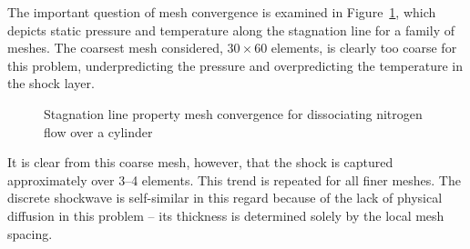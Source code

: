 The important question of mesh convergence is examined in Figure~\ref{fig:hornung_stagline_mesh_conv}, which depicts static pressure and temperature along the stagnation line for a family of meshes.  The coarsest mesh considered, $30\times 60$ elements, is clearly too coarse for this problem, underpredicting the pressure and overpredicting the temperature in the shock layer.
\begin{figure}[hbtp]
  \begin{center}
    \caption{Stagnation line property mesh convergence for dissociating nitrogen flow over a cylinder\label{fig:hornung_stagline_mesh_conv}}
  \end{center}
\end{figure}
It is clear from this coarse mesh, however, that the shock is captured approximately over 3--4 elements.  This trend is repeated for all finer meshes.  The discrete shockwave is self-similar in this regard because of the lack of physical diffusion in this problem -- its thickness is determined solely by the local mesh spacing.


